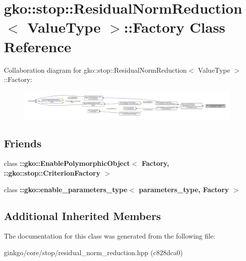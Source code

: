 \hypertarget{classgko_1_1stop_1_1ResidualNormReduction_1_1Factory}{}\section{gko\+:\+:stop\+:\+:Residual\+Norm\+Reduction$<$ Value\+Type $>$\+:\+:Factory Class Reference}
\label{classgko_1_1stop_1_1ResidualNormReduction_1_1Factory}


Collaboration diagram for gko\+:\+:stop\+:\+:Residual\+Norm\+Reduction$<$ Value\+Type $>$\+:\+:Factory\+:
\nopagebreak
\begin{figure}[H]
\begin{center}
\leavevmode
\includegraphics[width=350pt]{classgko_1_1stop_1_1ResidualNormReduction_1_1Factory__coll__graph}
\end{center}
\end{figure}
\subsection*{Friends}
\begin{DoxyCompactItemize}
\item 
\mbox{\label{classgko_1_1stop_1_1ResidualNormReduction_1_1Factory_aaa5507cf00e5361a77971746fefa42e6}} 
class {\bfseries \+::gko\+::\+Enable\+Polymorphic\+Object$<$ Factory, \+::gko\+::stop\+::\+Criterion\+Factory $>$}
\item 
\mbox{\label{classgko_1_1stop_1_1ResidualNormReduction_1_1Factory_a0d176cbd42d6214e11aee8c30ca256fc}} 
class {\bfseries \+::gko\+::enable\+\_\+parameters\+\_\+type$<$ parameters\+\_\+type, Factory $>$}
\end{DoxyCompactItemize}
\subsection*{Additional Inherited Members}


The documentation for this class was generated from the following file\+:\begin{DoxyCompactItemize}
\item 
ginkgo/core/stop/residual\+\_\+norm\+\_\+reduction.\+hpp (c828dca0)\end{DoxyCompactItemize}
